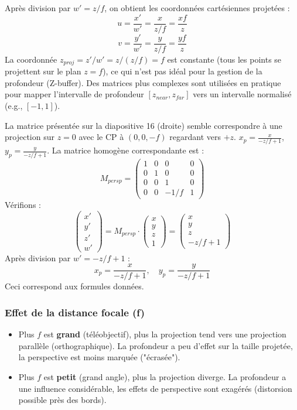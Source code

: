 \documentclass{article}
\begin{document}
Après division par $w' = z/f$, on obtient les coordonnées cartésiennes projetées :
\[ u = \frac{x'}{w'} = \frac{x}{z/f} = \frac{xf}{z} \]
\[ v = \frac{y'}{w'} = \frac{y}{z/f} = \frac{yf}{z} \]
La coordonnée $z_{proj} = z'/w' = z/(z/f) = f$ est constante (tous les points se projettent sur le plan $z=f$), ce qui n'est pas idéal pour la gestion de la profondeur (Z-buffer). Des matrices plus complexes sont utilisées en pratique pour mapper l'intervalle de profondeur $[z_{near}, z_{far}]$ vers un intervalle normalisé (e.g., $[-1, 1]$).

La matrice présentée sur la diapositive 16 (droite) semble correspondre à une projection sur $z=0$ avec le CP à $(0, 0, -f)$ regardant vers $+z$.
$x_p = \frac{x}{-z/f + 1}$, $y_p = \frac{y}{-z/f + 1}$.
La matrice homogène correspondante est :
\[
M_{persp} = \begin{pmatrix}
1 & 0 & 0 & 0 \\
0 & 1 & 0 & 0 \\
0 & 0 & 1 & 0 \\ %
0 & 0 & -1/f & 1
\end{pmatrix}
\]
Vérifions :
\[
\begin{pmatrix} x' \\ y' \\ z' \\ w' \end{pmatrix} = M_{persp} \cdot \begin{pmatrix} x \\ y \\ z \\ 1 \end{pmatrix} = \begin{pmatrix} x \\ y \\ z \\ -z/f + 1 \end{pmatrix}
\]
Après division par $w' = -z/f + 1$ :
\[ x_p = \frac{x}{-z/f + 1}, \quad y_p = \frac{y}{-z/f + 1} \]
Ceci correspond aux formules données.

\subsubsection{Effet de la distance focale (f)}
\begin{itemize}
    \item Plus $f$ est \textbf{grand} (téléobjectif), plus la projection tend vers une projection parallèle (orthographique). La profondeur a peu d'effet sur la taille projetée, la perspective est moins marquée ("écrasée").
    \item Plus $f$ est \textbf{petit} (grand angle), plus la projection diverge. La profondeur a une influence considérable, les effets de perspective sont exagérés (distorsion possible près des bords).
\end{itemize}
\end{document}
